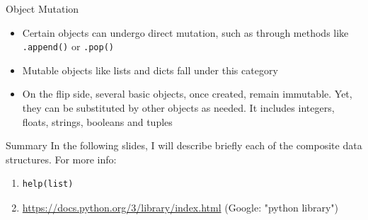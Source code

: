 \documentclass[
	11pt, 
]{beamer}
\begin{document}
\begin{frame}[fragile]{Object Mutation}
\begin{itemize}

\item  Certain objects can undergo direct mutation, such as through methods like \texttt{.append()} or \texttt{.pop()}

\item Mutable objects like lists and dicts fall under this category

\item On the flip side, several basic objects, once created, remain immutable. Yet, they can be substituted by other objects as needed. It includes integers, floats, strings, booleans and tuples
\end{itemize}


\begin{alertblock}{Summary}
    In the following slides, I will describe briefly each of the composite data structures. For more info:
    \begin{enumerate}

\item  \begin{verbatim}
help(list)
\end{verbatim}

\item  \url{https://docs.python.org/3/library/index.html} (Google: "python library")
    \end{enumerate}
\end{alertblock}
\end{frame}


\end{document}

